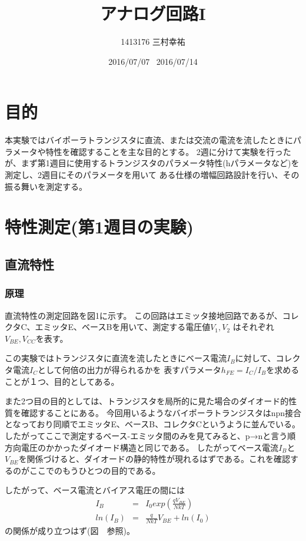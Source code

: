 \documentclass[11pt,a4j,titlepage]{jsarticle}
\title{アナログ回路I}
\author{1413176 三村幸祐}
\date{2016/07/07 \, 2016/07/14}
\begin{document}
 
 
  
 \section{目的}
  本実験ではバイポーラトランジスタに直流、または交流の電流を流したときにパラメータや特性を確認することを主な目的とする。
  2週に分けて実験を行ったが、まず第1週目に使用するトランジスタのパラメータ特性(hパラメータなど)を測定し、2週目にそのパラメータを用いて
  ある仕様の増幅回路設計を行い、その振る舞いを測定する。
  
 
 
 \section{特性測定(第1週目の実験)}

  \subsection{直流特性}
 
   \subsubsection{原理}
   直流特性の測定回路を図1に示す。
   この回路はエミッタ接地回路であるが、コレクタC、エミッタE、ベースBを用いて、測定する電圧値$V_1,V_2$
   はそれぞれ$V_{BE},V_{CC}$を表す。
   
   この実験ではトランジスタに直流を流したときにベース電流$I_B$に対して、コレクタ電流$I_C$として何倍の出力が得られるかを
   表すパラメータ$h_{FE}=I_C/I_B$を求めることが１つ、目的としてある。
   
   また2つ目の目的としては、トランジスタを局所的に見た場合のダイオード的性質を確認することにある。
   今回用いるようなバイポーラトランジスタはnpn接合となっており同順でエミッタE、ベースB、コレクタCというように並んでいる。
   したがってここで測定するベース-エミッタ間のみを見てみると、p→nと言う順方向電圧のかかったダイオード構造と同じである。
   したがってベース電流$I_B$と$V_{BE}$を関係づけると、ダイオードの静的特性が現れるはずである。これを確認するのがここでのもうひとつの目的である。
   
   したがって、ベース電流とバイアス電圧の間には
    \begin{eqnarray}
     I_B &=& I_0 exp(\frac{qV_{BE}}{NkT}) \\
     ln(I_B) &=& \frac{q}{NkT} V_{BE} + ln(I_0)
    \end{eqnarray}
   の関係が成り立つはず(図\ \ 参照)。
   
\end{document}
